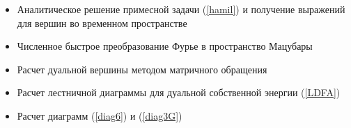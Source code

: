 \documentclass[11pt,a4paper]{report}
\begin{document}
\begin{itemize}
 \item Аналитическое решение примесной задачи (\ref{hamil}) и получение выражений для вершин во временном пространстве
 \item Численное быстрое преобразование Фурье в пространство Мацубары
 \item Расчет дуальной вершины методом матричного обращения
 \item Расчет лестничной диаграммы для дуальной собственной энергии (\ref{LDFA})
 \item Расчет диаграмм (\ref{diag6}) и (\ref{diag3G})
\end{itemize}


%
\end{document}
